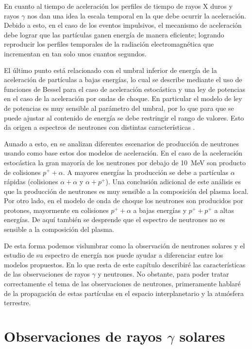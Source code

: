 En cuanto al tiempo de aceleración los perfiles de tiempo de rayos X duros y rayos $\gamma$ nos dan una idea la escala temporal en la que debe ocurrir la aceleración. Debido a esto, en el caso de los eventos impulsivos, el mecanismo de aceleración debe lograr que las partículas ganen energía de manera eficiente; logrando reproducir los perfiles temporales de la radiación electromagnética que incrementan en tan solo unos cuantos segundos.

El último punto está relacionado con el umbral inferior de energía de la aceleración de partículas a bajas energías, lo cual se describe mediante el uso de funciones de Bessel para el caso de aceleración estocástica y una ley de potencias en el caso de la aceleración por ondas de choque. En particular el modelo de ley de potencias es muy sensible al parámetro del umbral, por lo que para que se puede ajustar al contenido de energía se debe restringir el rango de valores. Esto da origen a espectros de neutrones con distintas características \cite{tsuchiyaphd}.

Aunado a esto, en \cite{murphy87} se analizan diferentes escenarios de producción de neutrones usando como base estos dos modelos de aceleración. En el caso de la aceleración estocástica la gran mayoría de los neutrones por debajo de \SI{10}{\mega\electronvolt} son producto de colisiones $p^{+}+\alpha$. A mayores energías la producción se debe a partículas $\alpha$ rápidas (colisiones $\alpha+\alpha$ y $\alpha+p^{+}$). Una conclusión adicional de este análisis es que la producción de neutrones es muy sensible a la composición del plasma local. Por otro lado, en el modelo de onda de choque los neutrones son producidos por protones, mayormente en colisiones $p^{+}+\alpha$ a bajas energías y $p^{+}+p^{+}$ a altas energías. De aquí también se desprende que el espectro de neutrones no es sensible a la composición del plasma.

De esta forma podemos vislumbrar como la observación de neutrones solares y el estudio de su espectro de energía nos puede ayudar a diferenciar entre los modelos propuestos. En lo que resta de este capítulo describiré las características de las observaciones de rayos $\gamma$ y neutrones. No obstante, para poder tratar correctamente el tema de las observaciones de neutrones, primeramente hablaré de la propagación de estas partículas en el espacio interplanetario y la atmósfera terrestre.

\section{Observaciones de rayos $\gamma$ solares}

